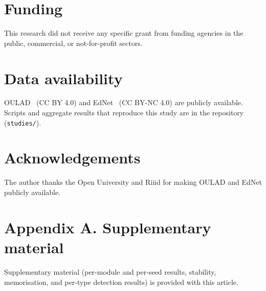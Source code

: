 \documentclass[preprint,12pt]{elsarticle}
\begin{document}
\section*{Funding}
This research did not receive any specific grant from funding agencies in
the public, commercial, or not-for-profit sectors.

\section*{Data availability}
OULAD~\cite{kuzilek2017oulad} (CC BY 4.0) and EdNet~\cite{choi2020ednet}
(CC BY-NC 4.0) are publicly available. Scripts and aggregate results that
reproduce this study are in the repository (\texttt{studies/}).

\section*{Acknowledgements}
The author thanks the Open University and Riiid for making OULAD and EdNet
publicly available.

\section*{Appendix A. Supplementary material}
Supplementary material (per-module and per-seed results, stability,
memorisation, and per-type detection results) is provided with this article.



\end{document}
